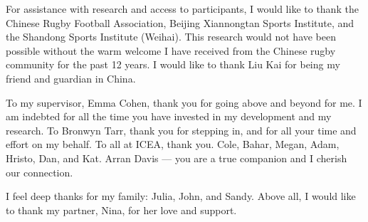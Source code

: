 
For assistance with research and access to participants, I would like to thank the Chinese Rugby Football Association, Beijing Xiannongtan Sports Institute, and the Shandong Sports Institute (Weihai).  This research would not have been possible without the warm welcome I have received from the Chinese rugby community for the past 12 years. I would like to thank Liu Kai for being my friend and guardian in China.

To my supervisor, Emma Cohen, thank you for going above and beyond for me. I am indebted for all the time you have invested in my development and my research.  To Bronwyn Tarr, thank you for stepping in, and for all your time and effort on my behalf.  To all at ICEA, thank you. Cole, Bahar, Megan, Adam, Hristo, Dan, and Kat.  Arran Davis --- you are a true companion and I cherish our connection.

I feel deep thanks for my family: Julia, John, and Sandy.  Above all, I would like to thank my partner, Nina, for her love and support.
